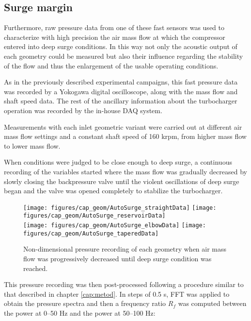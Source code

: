 \subsection{Surge margin}

Furthermore, raw pressure data from one of these fast sensors was used to characterize with high precision the air mass flow at which the compressor entered into deep surge conditions. In this way not only the acoustic output of each geometry could be measured but also their influence regarding the stability of the flow and thus the enlargement of the usable operating conditions.

As in the previously described experimental campaigns, this fast pressure data was recorded by a Yokogawa digital oscilloscope, along with the mass flow and shaft speed data. The rest of the ancillary information about the turbocharger operation was recorded by the in-house DAQ system.

Measurements with each inlet geometric variant were carried out at different air mass flow settings and a constant shaft speed of 160 krpm, from higher mass flow to lower mass flow. 

When conditions were judged to be close enough to deep surge, a continuous recording of the variables started where the mass flow was gradually decreased by slowly closing the backpressure valve until the violent oscillations of deep surge began and the valve was opened completely to stabilize the turbocharger.

\begin{figure}[htb!]
\centering
\texttt{[image: figures/cap\_geom/AutoSurge\_straightData]}
\texttt{[image: figures/cap\_geom/AutoSurge\_reservoirData]}\\[3mm]
\texttt{[image: figures/cap\_geom/AutoSurge\_elbowData]}
\texttt{[image: figures/cap\_geom/AutoSurge\_taperedData]}
\caption{Non-dimensional pressure recording of each geometry when air mass flow was progressively decreased until deep surge condition was reached.}
\label{fig:autosurge_simple_geom}
\end{figure}

This pressure recording was then post-processed following a procedure similar to that described in chapter \ref{cap:metod}. In steps of 0.5 s, FFT was applied to obtain the pressure spectra and then a frequency ratio $R_f$ was computed between the power at 0--50 Hz and the power at 50--100 Hz:

